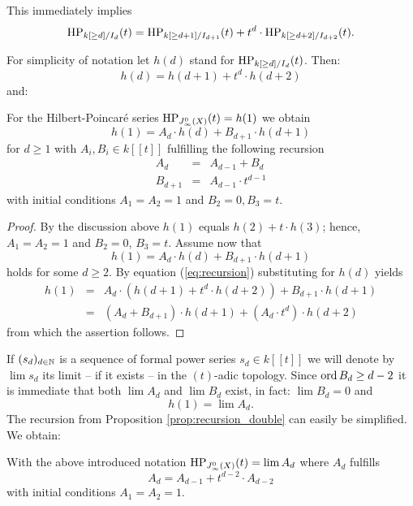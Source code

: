 This immediately implies 
 $$\operatorname{HP}_{k[\geq  d]/I_d}(t) = \operatorname{HP}_{k[\geq d+1]/I_{d+1}}(t) + t^d\cdot \operatorname{HP}_{k[\geq
  d+2]/I_{d+2}}(t).$$

For simplicity of notation let $h(d)$ stand for $\operatorname{HP}_{k[\geq
  d]/I_d}(t)$. Then:
\begin{equation}\label{eq:recursion}
h(d) = h(d+1) + t^d\cdot h(d+2)
\end{equation}
and:

\begin{samepage}
\begin{Prop}\label{prop:recursion_double}
  For the Hilbert-Poincar\'e series $\operatorname{HP}_{J_\infty^0(X)}(t)=h(1)$ we obtain
$$h(1) = A_d\cdot h(d) + B_{d+1}\cdot h(d+1)$$
for $d\geq 1$ with $A_i,B_i\in k[[t]]$ fulfilling the following
recursion
\begin{eqnarray*}
  A_d & = & A_{d-1} + B_d\\
  B_{d+1} & = & A_{d-1}\cdot t^{d-1}
\end{eqnarray*}
with initial conditions $A_1=A_2=1$ and $B_2=0, B_3=t$.
\end{Prop}
\end{samepage}

\begin{proof}
  By the discussion above $h(1)$ equals $ h(2) + t\cdot h(3)$; hence,
  $A_1=A_2=1$ and $B_2=0$, $B_3=t$. Assume now that $$h(1) = A_d\cdot
  h(d) + B_{d+1}\cdot h(d+1)$$ holds for some $d\geq 2$. By
  equation (\ref{eq:recursion}) substituting for $h(d)$ yields
  \begin{eqnarray*}
    h(1) & = & A_d\cdot (h(d+1) + t^d\cdot h(d+2)) + B_{d+1}\cdot h(d+1)\\
    & = & (A_d + B_{d+1})\cdot h(d+1) + (A_d\cdot t^d)\cdot h(d+2)
  \end{eqnarray*}
  from which the assertion follows.
\end{proof}

If $(s_d)_{d\in \mathbb{N}}$ is a sequence of formal power series $s_d\in
k[[t]]$ we will denote by $\lim s_d$ its limit -- if it exists -- in
the $(t)$-adic topology. Since $\textnormal{ord}\, B_d \geq d-2$ it is immediate
that both $\lim A_d$ and $\lim B_d$ exist, in fact: $\lim B_d=0$ and
$$h(1) = \lim A_d.$$
The recursion from Proposition \ref{prop:recursion_double} can easily
be simplified. We obtain:

\begin{Cor}\label{cor:recursion_rogersramanujan}
  With the above introduced notation
  $\operatorname{HP}_{J_\infty^0(X)}(t)=\lim A_d$ where $A_d$ fulfills $$A_d = A_{d-1} + t^{d-2}\cdot A_{d-2}$$
  with initial conditions $A_1=A_2=1$.
\end{Cor}

